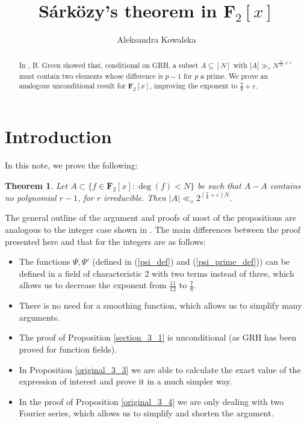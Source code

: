 \documentclass[11pt, reqno]{amsart}
\title{Sárközy's theorem in $\mathbf{F}_2[x]$}
\author{Aleksandra Kowalska}
\newtheorem{theorem}{Theorem}[section]
\numberwithin{equation}{section}
\newcommand\eps{\varepsilon}
\begin{document}
\begin{abstract}
In \cite{original}, B. Green showed that, conditional on GRH, a subset $A \subseteq [N]$ with $|A| \gg_{\eps} N^{\frac{11}{12}+\eps}$ must contain two elements whose difference is $p-1$ for $p$ a prime. We prove an analogous unconditional result for $\mathbf{F}_2[x]$, improving the exponent to $\frac{7}{8}+\eps$.
\end{abstract}

\maketitle

\section{Introduction}
\label{section_introduction}

In this note, we prove the following:

\begin{theorem}
\label{original_1_1}
    Let $A \subset \{f \in \mathbf{F}_2[x]: \deg(f) < N\}$ be such that $A-A$ contains no polynomial $r-1$, for $r$ irreducible. Then $|A| \ll_{\eps} 2^{(\frac{7}{8}+\eps)N}$.
\end{theorem}

The general outline of the argument and proofs of most of the propositions are analogous to the integer case shown in \cite{original}. The main differences between the proof presented here and that for the integers are as follows:
\begin{itemize}
    \item The functions $\Psi, \Psi'$ (defined in (\ref{psi_def}) and (\ref{psi_prime_def})) can be defined in a field of characteristic $2$ with two terms instead of three, which allows us to decrease the exponent from $\frac{11}{12}$ to $\frac{7}{8}$.
    \item There is no need for a smoothing function, which allows us to simplify many arguments.
    \item The proof of Proposition \ref{section_3_1} is unconditional (as GRH has been proved for function fields).
    \item In Proposition \ref{original_3_3} we are able to calculate the exact value of the expression of interest and prove it in a much simpler way.
    \item In the proof of Proposition \ref{original_3_4} we are only dealing with two Fourier series, which allows us to simplify and shorten the argument.
\end{itemize}
\end{document}
